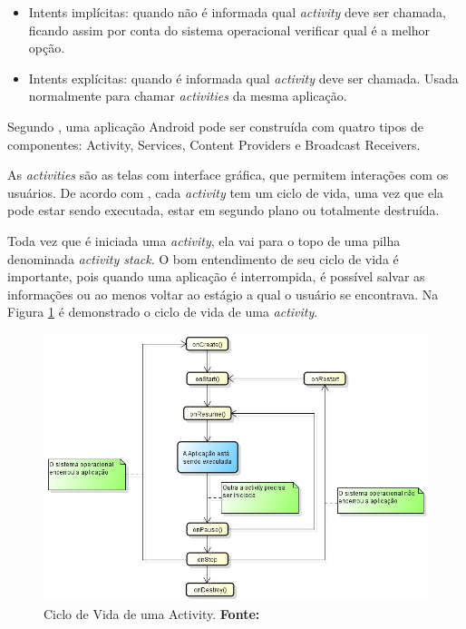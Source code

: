 	\begin{itemize}
	  
	  \item Intents implícitas: quando não é informada qual \textit{activity} deve
	  ser chamada, ficando assim por conta do sistema operacional verificar qual é a
	  melhor opção.
	  
	  \item Intents explícitas: quando é informada qual \textit{activity} deve ser chamada.
	  Usada normalmente para chamar \textit{activities} da mesma aplicação.
	  
	\end{itemize}
	
	\par Segundo , uma aplicação Android pode ser construída
com quatro tipos de componentes: Activity, Services, Content Providers e
Broadcast Receivers.

	\par As \textit{activities} são as telas com interface gráfica, que permitem
interações com os usuários. De acordo com , cada
\textit{activity} tem um ciclo de vida, uma vez que ela pode estar sendo
executada, estar em segundo plano ou totalmente destruída.

	\par Toda vez que é iniciada uma \textit{activity}, ela vai para o topo de uma pilha
denominada \textit{activity stack}. O bom entendimento de seu ciclo de vida é
importante, pois quando uma aplicação é interrompida, é possível salvar as
informações ou ao menos voltar ao estágio a qual o usuário se encontrava. Na
Figura \ref{fig:qt1} é demonstrado o ciclo de vida de uma \textit{activity}.

	\begin{figure}[h!]
		\centerline{\includegraphics[scale=0.8]{./imagens/1_q_teorico/qt1.png}}
		\caption[Ciclo de Vida de uma Activity]{Ciclo de Vida de uma
		Activity.
		 \textbf{Fonte:}}
		\label{fig:qt1}
	\end{figure}


